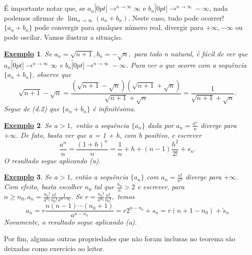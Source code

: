 \documentclass{article}
\newtheorem{example}{\underline{Exemplo}}
\begin{document}
  \'E importante notar que, se $a_{n}\overbracket[0pt]{\longrightarrow}^{n\to \infty}\infty$ e $b_{n}\overbracket[0pt]{\longrightarrow}^{n\to \infty}-\infty$, nada
  podemos afirmar de $\lim_{n\to\infty}(a_{n}+b_{n}).$ Neste caso, tudo pode ocorrer! $\{a_{n} + b_{n}\} $ pode convergir para qualquer n\'umero real,
  divergir para $+\infty, -\infty$ ou pode oscilar. Vamos ilustrar a situa\c c\~ao.
 \begin{example}
   Se $a_{n} = \sqrt{n+1}, b_{n} = -\sqrt{n},$ para todo n natural, \'e f\'acil de ver que $a_{n}\overbracket[0pt]{\longrightarrow}^{n\to \infty}\infty$ e $b_{n}\overbracket[0pt]{\longrightarrow}^{n\to \infty}-\infty$.
   Para ver o que ocorre com a sequ\^encia $\{a_{n}+b_{n}\} $, observe que 
     $$
     \sqrt{n+1} - \sqrt{n} = \frac{(\sqrt{n+1}-\sqrt{n})(\sqrt{n+1}+\sqrt{n})}{\sqrt{n+1}+\sqrt{n}} = \frac{1}{\sqrt{n+1}+\sqrt{n}}.
     $$ 
     Segue de (d.2) que $\{a_{n}+b_{n}\} $ \'e infinit\'esima.
 \end{example}
\begin{example}
  Se $a > 1,$ ent\~ao a sequ\^encia $\{a_{n}\}$ dada por $a_{n} = \frac{a^{n}}{n}$ diverge para $+\infty.$ De fato, basta ver que
a = 1 + h, com h positivo, e escrever 
  $$
    \frac{a^{n}}{n} = \frac{(1+h)^{n}}{n} = \frac{1}{n} + h + (n-1)\frac{h^{2}}{2!} + s_{n}.
  $$
  O resultado segue aplicando (a).
\end{example}
 \begin{example}
   Se $a > 1$, ent\~ao a sequ\^encia $\{a_{n}\}$ com $a_{n} = \frac{n!}{a^{n}}$ diverge para $+\infty.$ Com efeito, basta escolher
 $n_{0}$ tal que $\frac{n_{0}}{a} > 2$ e escrever, para $n\geq{n_{0}}, a_{n} = \frac{n_{0}!}{a^{n_{0}}}\frac{n!}{n_{0}!}\frac{1}{a^{n-n_{0}}}.$
 Se $r = \frac{n_{0}!}{a^{n_{0}}}\frac{n!}{n_{0}!},$ temos 
   $$
   a_{n} = r \frac{n(n-1)\cdots(n_{0}+1)}{a^{n-n_{0}}} = r2^{n-n_{0}} + s_{n} = r(n+1 - n_{0}) + \tilde{s}_{n}
   $$
   Novamente, o resultado segue aplicando (a).
 \end{example}
  Por fim, algumas outras propriedades que n\~ao foram inclusas no teorema s\~ao deixadas como exerc\'icio ao leitor.
\end{document}
